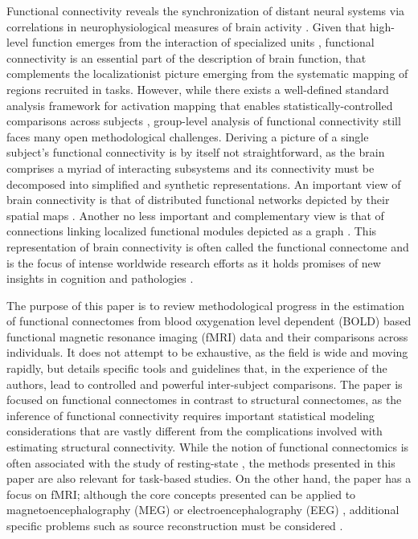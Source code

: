 \documentclass[5p]{elsarticle}
\begin{document}
Functional connectivity reveals the synchronization of distant neural systems
via correlations in neurophysiological measures of brain activity 
\cite{friston1993, biswal1995}.  Given that
high-level function emerges from the interaction of specialized units
\cite{tononi1992},
functional connectivity is an essential part of the description of brain
function, that complements the localizationist picture emerging from the
systematic mapping of regions recruited in tasks\cite{sporns2004}. However,
while there exists a well-defined standard analysis framework for activation
mapping that enables statistically-controlled comparisons across subjects
\cite{friston1995}, group-level analysis of functional connectivity still faces
many open methodological challenges. Deriving a picture of a single subject's
functional connectivity is by itself not straightforward, as the brain comprises
a myriad of interacting subsystems and its connectivity must be decomposed into
simplified and synthetic representations. An important view of brain
connectivity is that of distributed functional networks depicted by their
spatial maps \cite{fox2005}. Another no less important and complementary view is
that of connections linking localized functional modules depicted as a graph
\cite{bullmore2009}. This representation of brain connectivity is often called
the functional connectome \cite{sporns2005} and is the focus of intense
worldwide research efforts as it holds promises of new insights in cognition and
pathologies \cite{greicius2008b,biswal2010,fox2010}.

The purpose of this paper is to review methodological progress in the
estimation of functional connectomes from blood oxygenation level dependent
(BOLD) based functional magnetic resonance imaging (fMRI) data and their
comparisons across individuals.  It does not attempt
to be exhaustive, as the field is wide and moving rapidly, but details
specific tools and guidelines that, in the experience of the authors,
lead to controlled and powerful inter-subject comparisons. The paper is
focused on functional connectomes in contrast to structural connectomes,
as the inference of functional connectivity requires important statistical
modeling considerations that are vastly different from the complications involved
with estimating structural connectivity.
While the notion of functional
connectomics is often associated with the study of resting-state
\cite{biswal2010}, the methods presented in this paper are also relevant
for task-based studies. On the other hand, the paper has a focus on fMRI;
although the core concepts presented can be applied to 
magnetoencephalography (MEG) or electroencephalography (EEG)
\cite{stam2004}, additional specific problems such as source
reconstruction must be considered \cite{schoffelen2009}.
\end{document}
